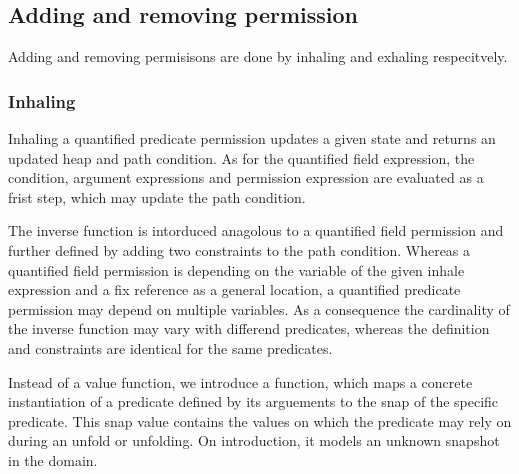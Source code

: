 \documentclass[12pt]{article}
\begin{document}
\subsection{Adding and removing permission}
Adding and removing permisisons are done by inhaling and exhaling respecitvely.

\subsubsection{Inhaling}
Inhaling a quantified predicate permission updates a given state and returns an updated heap and path condition.
As for the quantified field expression, the condition, argument expressions and permission expression are evaluated as a frist step, which may update the path condition. 

The inverse function is intorduced anagolous to a quantified field permission and further defined by adding two constraints to the path condition. Whereas a quantified field permission is depending on the variable of the given inhale expression and a fix reference as a general location, a quantified predicate permission may depend on multiple variables. As a consequence the cardinality of the inverse function may vary with differend predicates, whereas the definition and constraints are identical for the same predicates.

Instead of a value function, we introduce a function, which maps a concrete instantiation of a predicate defined by its arguements to the snap of the specific predicate. This snap value contains the values on which the predicate may rely on during an unfold or unfolding. On introduction, it models an unknown snapshot in the domain. %
\end{document}
